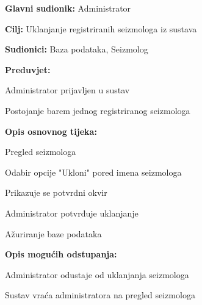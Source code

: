 					\noindent {}
					\begin{packed_item}
	
						\item \textbf{Glavni sudionik:} Administrator
						\item \textbf{Cilj:} Uklanjanje registriranih seizmologa iz sustava
						\item \textbf{Sudionici:} Baza podataka, Seizmolog
						\item \textbf{Preduvjet:} 
							\begin{packed_item}
								\item Administrator prijavljen u sustav
								\item Postojanje barem jednog registriranog seizmologa
							\end{packed_item}
						\item  \textbf{Opis osnovnog tijeka:}
						
						\item[] \begin{packed_enum}
	
							\item Pregled seizmologa
							\item Odabir opcije "Ukloni" pored imena seizmologa
							\item Prikazuje se potvrdni okvir
							\item Administrator potvrđuje uklanjanje
							\item Ažuriranje baze podataka
							
						\end{packed_enum}
					\item \textbf{Opis mogućih odstupanja:}
					\item[] \begin{packed_item}
							\item[3.a] Administrator odustaje od uklanjanja seizmologa
							\item[] \begin{packed_enum}
								\item Sustav vraća administratora na pregled seizmologa
							\end{packed_enum}	
						\end{packed_item}
					\end{packed_item}

